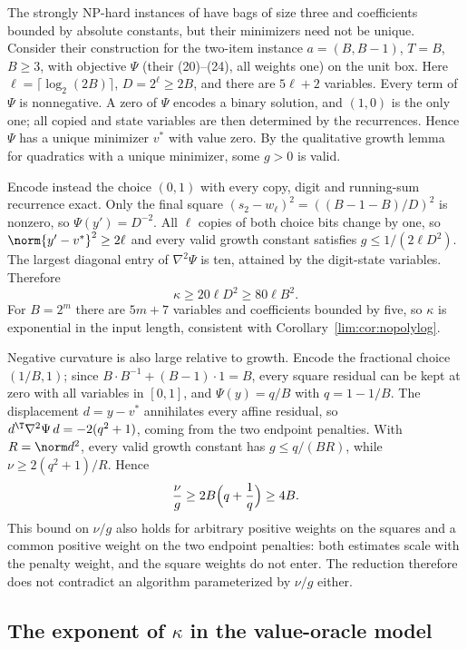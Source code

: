 \begin{remark}
\label{lim:rem:dk}
The strongly NP-hard instances of \cite[Theorem~3]{DelPiaKhajavirad2026}
have bags of size three and coefficients bounded by absolute constants,
but their minimizers need not be unique. Consider their construction for
the two-item instance $a=(B,B-1)$, $T=B$, $B\ge3$, with objective $\Psi$
(their (20)--(24), all weights one) on the unit box. Here
$\ell=\lceil\log_2(2B)\rceil$, $D=2^\ell\ge2B$, and there are $5\ell+2$
variables. Every term of $\Psi$ is nonnegative. A zero of $\Psi$ encodes a
binary solution, and $(1,0)$ is the only one; all copied and state variables
are then determined by the recurrences. Hence $\Psi$ has a unique minimizer
$v^*$ with value zero. By the qualitative growth lemma for quadratics with a
unique minimizer, some $g>0$ is valid.

Encode instead the choice $(0,1)$ with every copy, digit and running-sum
recurrence exact. Only the final square
$(s_2-w_\ell)^2=((B-1-B)/D)^2$ is nonzero, so $\Psi(y')=D^{-2}$. All
$\ell$ copies of both choice bits change by one, so
$\norm{y'-v^*}^2\ge2\ell$ and every valid growth constant satisfies
$g\le1/(2\ell D^2)$. The largest diagonal entry of $\nabla^2\Psi$ is ten,
attained by the digit-state variables. Therefore
\[
\kappa\ge20\ell D^2\ge80\ell B^2 .
\]
For $B=2^m$ there are $5m+7$ variables and coefficients bounded by five, so
$\kappa$ is exponential in the input length, consistent with
Corollary~\ref{lim:cor:nopolylog}.

Negative curvature is also large relative to growth. Encode the fractional
choice $(1/B,1)$; since $B\cdot B^{-1}+(B-1)\cdot1=B$, every square
residual can be kept at zero with all variables in $[0,1]$, and
$\Psi(y)=q/B$ with $q=1-1/B$. The displacement $d=y-v^*$ annihilates every
affine residual, so $d^{\T}\nabla^2\Psi\,d=-2(q^2+1)$, coming from the
two endpoint penalties. With $R=\norm d^2$, every valid growth constant has
$g\le q/(BR)$, while $\nu\ge2(q^2+1)/R$. Hence
\[
\frac\nu g\ge2B\Bigl(q+\frac1q\Bigr)\ge4B .
\]
This bound on $\nu/g$ also holds for arbitrary positive weights on the
squares and a common positive weight on the two endpoint penalties: both
estimates scale with the penalty weight, and the square weights do not
enter. The reduction therefore does not contradict an algorithm
parameterized by $\nu/g$ either.
\end{remark}

\subsection{The exponent of $\kappa$ in the value-oracle model}
\label{sec:limits-oracle}

